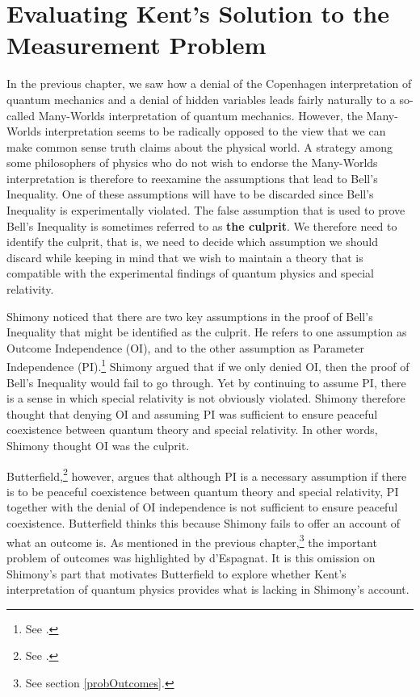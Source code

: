 \chapter{Evaluating Kent's Solution to the Measurement Problem}


In the previous chapter, we saw how a denial of the Copenhagen interpretation of quantum mechanics and a denial of hidden variables leads fairly naturally to a so-called Many-Worlds interpretation of quantum mechanics. However, the Many-Worlds interpretation seems to be radically opposed to the view that we can make common sense truth claims about the physical world. A strategy among some philosophers of physics who do not wish to endorse the Many-Worlds interpretation is therefore to reexamine the assumptions that lead to Bell's Inequality. One of these assumptions will have to be discarded since Bell's Inequality is experimentally violated. The false assumption that is used to prove Bell's Inequality is sometimes referred to as \textbf{the culprit}. We therefore need to identify the culprit, that is, we need to decide which assumption we should discard while keeping in mind that we wish to maintain a theory that is compatible with the experimental findings of quantum physics and special relativity.

Shimony noticed that there are two key assumptions in the proof of Bell's Inequality that might be identified as the culprit. He refers to one assumption as {Outcome Independence} (OI), and to the other assumption as {Parameter Independence} (PI).\footnote{See \cite[146-147]{Shimony86}.} Shimony argued that if we only denied OI, then the proof of Bell's Inequality would fail to go through. Yet by continuing to assume PI, there is a sense in which special relativity is not obviously violated. Shimony therefore thought that denying OI and assuming PI was sufficient to ensure peaceful coexistence between quantum theory and special relativity. In other words, Shimony thought OI was the culprit. 

Butterfield,\footnote{See \cite{Butterfield}.} however, argues that although PI is a necessary assumption if there is to be peaceful coexistence between quantum theory and special relativity, PI together with the denial of OI independence is not sufficient to ensure peaceful coexistence. Butterfield thinks this because Shimony fails to offer an account of what an outcome is. As mentioned in the previous chapter,\footnote{See section \ref{probOutcomes}.} the important problem of outcomes was highlighted by d'Espagnat.
It is this omission on Shimony's part that motivates Butterfield to explore whether Kent's interpretation of quantum physics provides what is lacking in Shimony's account. 

